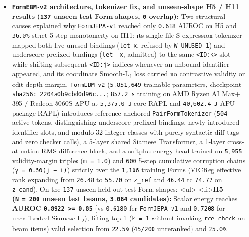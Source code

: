 \documentclass[10pt,letterpaper]{article}
\begin{document}
\begin{itemize}
\item
  \textbf{\texttt{FormEBM-\allowbreak{}v2} architecture, tokenizer fix, and
  unseen-shape H5 / H11 results (\texttt{137} unseen test Form shapes,
  \texttt{0} overlap):} Two structural causes explained why
  \texttt{FormJEPA-\allowbreak{}v1} reached only \texttt{0.618} AUROC on H5 and
  \texttt{36.0\%} strict 5-step monotonicity on H11: its single-file
  S-expression tokenizer mapped both live unused bindings
  (\texttt{let\ x}, refused by \texttt{W-\allowbreak{}UNUSED-\allowbreak{}1}) and
  underscore-prefixed bindings (\texttt{let\ \_x}, admitted) to the same
  \texttt{\textless{}ID:k\textgreater{}} slot while shifting subsequent
  \texttt{\textless{}ID:j\textgreater{}} indices whenever an unbound
  identifier appeared, and its coordinate Smooth-L\textsubscript{1} loss
  carried no contrastive validity or edit-depth margin.
  \texttt{FormEBM-\allowbreak{}v2} (\texttt{5,851,649} trainable parameters,
  checkpoint \texttt{sha256:\ 2204a0b9\allowbreak{}cbd0d96c.\allowbreak{}.\allowbreak{}.\allowbreak{}}; \texttt{857.2\ s}
  training on AMD Ryzen AI Max+ 395 / Radeon 8060S APU at
  \texttt{5,\allowbreak{}375.\allowbreak{}0\ J} core RAPL and \texttt{40,\allowbreak{}602.\allowbreak{}4\ J} APU package
  RAPL) introduces reference-anchored \texttt{PairFormTokenizer}
  (\texttt{504} active tokens, distinguishing underscore-prefixed
  bindings, newly introduced identifier slots, and modulo-32 integer
  classes with purely syntactic diff tags and zero checker calls), a
  5-layer shared Siamese Transformer, a 1-layer cross-attention RMS
  difference block, and a softplus energy head trained on \texttt{5,955}
  validity-margin triples (\texttt{m\ =\ 1.0}) and \texttt{600} 5-step
  cumulative corruption chains (\texttt{γ\ =\ 0.\allowbreak{}50(\allowbreak{}j\ −\ i)}) strictly
  over the \texttt{1,106} training Forms (VICReg effective rank
  expanding from \texttt{26.48} to \texttt{55.70} on \texttt{z\_ref} and
  \texttt{46.44} to \texttt{74.72} on \texttt{z\_cand}). On the
  \texttt{137} unseen held-out test Form shapes:
  \textless ul\textgreater{} \textless li\textgreater{}\textbf{H5
  (\texttt{N\ =\ 200} unseen test beams, \texttt{3,064} candidates):}
  Scalar energy reaches \textbf{AUROC
  \texttt{0.8922\ \textgreater{}=\ 0.85}} (vs \texttt{0.6180} for
  \texttt{FormJEPA-\allowbreak{}v1} and \texttt{0.7208} for uncalibrated Siamese
  L\textsubscript{2}), lifting top-1 (\texttt{k\ =\ 1} without invoking
  \texttt{rce\ check} on beam items) valid selection from
  \texttt{22.5\%} (\texttt{45/200} unreranked) and \texttt{25.0\%}

\end{itemize}
\end{document}
